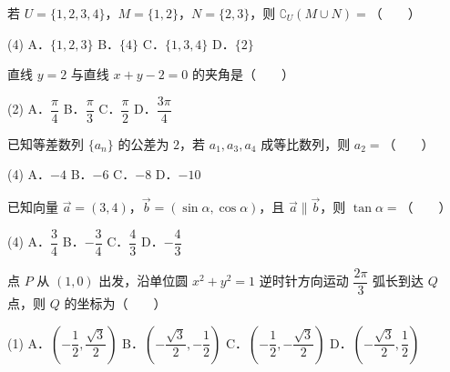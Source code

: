 

\begin{question}
若 $U = \{1, 2, 3, 4\}$，$M = \{1, 2\}$，$N = \{2, 3\}$，则 $\complement_U (M \cup N) =$\mbox{（　　）}

\begin{gkopts}(4)
\task A．$\{1, 2, 3\}$
\task B．$\{4\}$
\task C．$\{1, 3, 4\}$
\task D．$\{2\}$
\end{gkopts}

\end{question}
\begin{question}
直线 $y = 2$ 与直线 $x + y - 2 = 0$ 的夹角是\mbox{（　　）}

\begin{gkopts}(2)
\task A．$\dfrac{\pi}{4}$
\task B．$\dfrac{\pi}{3}$
\task C．$\dfrac{\pi}{2}$
\task D．$\dfrac{3\pi}{4}$
\end{gkopts}

\end{question}
\begin{question}
已知等差数列 $\{a_n\}$ 的公差为 $2$，若 $a_1, a_3, a_4$ 成等比数列，则 $a_2 =$\mbox{（　　）}

\begin{gkopts}(4)
\task A．$-4$
\task B．$-6$
\task C．$-8$
\task D．$-10$
\end{gkopts}

\end{question}
\begin{question}
已知向量 $\vec{a} = (3, 4)$，$\vec{b} = (\sin\alpha, \cos\alpha)$，且 $\vec{a} \parallel \vec{b}$，则 $\tan\alpha =$\mbox{（　　）}

\begin{gkopts}(4)
\task A．$\dfrac{3}{4}$
\task B．$-\dfrac{3}{4}$
\task C．$\dfrac{4}{3}$
\task D．$-\dfrac{4}{3}$
\end{gkopts}

\end{question}
\begin{question}
点 $P$ 从 $(1, 0)$ 出发，沿单位圆 $x^2 + y^2 = 1$ 逆时针方向运动 $\dfrac{2\pi}{3}$ 弧长到达 $Q$ 点，则 $Q$ 的坐标为\mbox{（　　）}

\begin{gkopts}(1)
\task A．$\left(-\dfrac{1}{2}, \dfrac{\sqrt{3}}{2}\right)$
\task B．$\left(-\dfrac{\sqrt{3}}{2}, -\dfrac{1}{2}\right)$
\task C．$\left(-\dfrac{1}{2}, -\dfrac{\sqrt{3}}{2}\right)$
\task D．$\left(-\dfrac{\sqrt{3}}{2}, \dfrac{1}{2}\right)$
\end{gkopts}

\end{question}
